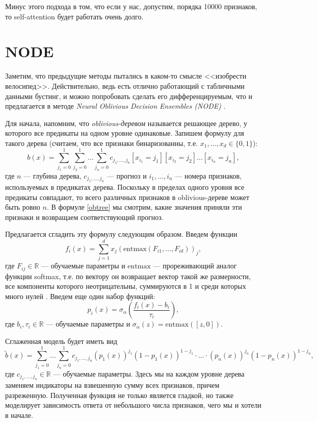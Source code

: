 \documentclass[12pt,fleqn]{article}
\begin{document}
Минус этого подхода в том, что если у нас, допустим, порядка 10000 признаков, то self-attention будет работать очень долго.

\section{NODE}
Заметим, что предыдущие методы пытались в каком-то смысле <<изобрести велосипед>>. Действительно, ведь есть отлично работающий с табличными данными бустинг, и можно попробовать сделать его дифференцируемым, что и предлагается в методе \textit{Neural Oblivious Decision Ensembles (NODE)} \cite{node}.

Для начала, напомним, что \textit{oblivious-деревом} называется решающее дерево, у которого все предикаты на одном уровне одинаковые. Запишем формулу для такого дерева (считаем, что все признаки бинаризованны, т.е. $ x_1, \ldots, x_d \in \{0, 1\} $):
\begin{equation}\label{obtree}
	b(x) = \sum\limits_{j_1 = 0}^1 \sum\limits_{j_2 = 0}^1 \ldots \sum\limits_{j_n = 0}^1 c_{j_1, \ldots, j_n} [x_{i_1} = j_1] [x_{i_2} = j_2] \ldots [x_{i_n} = j_n],
\end{equation}
где $ n $ --- глубина дерева, $ c_{j_1, \ldots, j_n} $ --- прогноз и $ i_1, \ldots, i_n $ --- номера признаков, используемых в предикатах дерева. Поскольку в пределах одного уровня все предикаты совпадают, то всего различных признаков в oblivious-дереве может быть ровно $ n $. В формуле \eqref{obtree} мы смотрим, какие значения приняли эти признаки и возвращаем соответствующий прогноз.

Предлагается сгладить эту формулу следующим образом. Введем функции
\[
	f_i(x) = \sum\limits_{j = 1}^d x_j \left(\mathrm{entmax}(F_{i1}, \ldots, F_{id})\right)_j,
\]
где $ F_{ij} \in \mathbb{R} $ --- обучаемые параметры и $ \mathrm{entmax} $ --- прореживающий аналог функции softmax, т.е. по вектору он возвращает вектор такой же размерности, все компоненты которого неотрицательны, суммируются в 1 и среди которых много нулей \cite{entmax}. Введем еще один набор функций:
\[
	p_i(x) = \sigma_\alpha\left(\frac{f_i(x) - b_i}{\tau_i}\right),
\]
где $ b_i, \tau_i \in \mathbb{R} $ --- обучаемые параметры и $ \sigma_\alpha(z) = \mathrm{entmax}([z, 0]) $.

Сглаженная модель будет иметь вид
\[
	\tilde b(x) = \sum\limits_{j_1 = 0}^1 \ldots \sum\limits_{j_n = 0}^1 c_{j_1, \ldots, j_n} (p_1(x))^{j_1} (1 - p_1(x))^{1 - j_1} \cdot \ldots \cdot (p_n(x))^{j_n} (1 - p_n(x))^{1 - j_n},
\]
где $ c_{j_1, \ldots, j_n} \in \mathbb{R} $ --- обучаемые параметры. Здесь мы на каждом уровне дерева заменяем индикаторы на взвешенную сумму всех признаков, причем разреженную. Полученная функция не только является гладкой, но также моделирует зависимость ответа от небольшого числа признаков, чего мы и хотели в начале.
\end{document}

